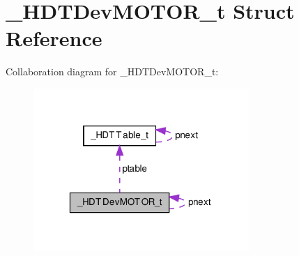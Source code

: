 \hypertarget{struct___h_d_t_dev_m_o_t_o_r__t}{\section{\-\_\-\-H\-D\-T\-Dev\-M\-O\-T\-O\-R\-\_\-t \-Struct \-Reference}
\label{struct___h_d_t_dev_m_o_t_o_r__t}
}


\-Collaboration diagram for \-\_\-\-H\-D\-T\-Dev\-M\-O\-T\-O\-R\-\_\-t\-:\nopagebreak
\begin{figure}[H]
\begin{center}
\leavevmode
\includegraphics[width=232pt]{struct___h_d_t_dev_m_o_t_o_r__t__coll__graph}
\end{center}
\end{figure}
